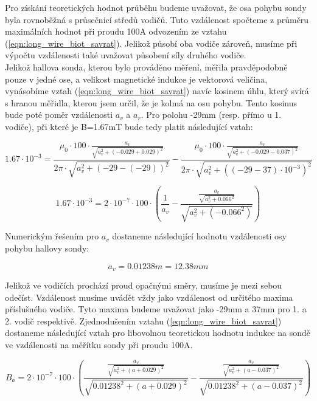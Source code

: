 \documentclass{praktikum}
\begin{document}
Pro získání teoretických hodnot průběhu budeme uvažovat, že osa pohybu sondy byla rovnoběžná s průsečnicí středů vodičů. Tuto vzdálenost spočteme z průměru maximálních hodnot při proudu 100A odvozením ze vztahu (\ref{eqn:long_wire_biot_savrat}). Jelikož působí oba vodiče zároveň, musíme při výpočtu vzdálenosti také uvažovat působení síly druhého vodiče.\\ Jelikož hallova sonda, kterou bylo prováděno měření, měřila pravděpodobně pouze v jedné ose, a velikost magnetické indukce je vektorová veličina, vynásobíme vztah (\ref{eqn:long_wire_biot_savrat}) navíc kosinem úhlu, který svírá s hranou měřidla, kterou jsem určil, že je kolmá na osu pohybu. Tento kosinus bude poté poměr vzdálenosti $a_v$ a $a_r$. Pro polohu -29mm (resp. přímo u 1. vodiče), při které je B=1.67mT bude tedy platit následující vztah:

\[ 1.67 \cdot 10^{-3} = \frac{\mu _0 \cdot 100\cdot \frac{a_v}{\sqrt{a_v^2+(-0.029+0.029)^2}}}{2\pi \cdot \sqrt{a_v^2 + (-29-(-29))^2}} - \frac{\mu _0 \cdot 100\cdot \frac{a_v}{\sqrt{a_v^2+(-0.029-0.037)^2}}}{2\pi \cdot \sqrt{a_v^2 + ((-29-37)\cdot 10^{-3})^2}} \]

\[ 1.67 \cdot 10^{-3} = 2 \cdot 10^{-7} \cdot 100 \cdot \left(\frac{1}{a_v} - \frac{\frac{a_v}{\sqrt{a_v^2+0.066^2}}}{\sqrt{a_v^2 + (-0.066^2)}}\right) \]

Numerickým řešením pro $a_v$ dostaneme následující hodnotu vzdálenosti osy pohybu hallovy sondy:

\begin{equation}
\label{eqn:calc_opositewire_distance}
a_v=0.01238m=12.38mm
\end{equation}



Jelikož ve vodičích prochází proud opačnými směry, musíme je mezi sebou odečíst. Vzdálenost musíme uvádět vždy jako vzdálenost od určitého maxima příslušného vodiče. Tyto maxima budeme uvažovat jako -29mm a 37mm pro 1. a 2. vodič respektivě. Zjednodušením vztahu (\ref{eqn:long_wire_biot_savrat}) dostaneme následující vztah pro libovolnou teoretickou hodnotu indukce na sondě ve vzdálenosti na měřítku sondy při proudu 100A.

\begin{equation}
\label{eqn:calc_oppositewire_magnetic}
B_a = 2 \cdot 10^{-7} \cdot 100 \cdot \left(\frac{\frac{a_v}{\sqrt{a_v^2+(a+0.029)^2}}}{\sqrt{0.01238^2 + (a+0.029)^2}} - \frac{\frac{a_v}{\sqrt{a_v^2+(a-0.037)^2}}}{\sqrt{0.01238^2 + (a-0.037)^2}}\right)
\end{equation}
\end{document}
